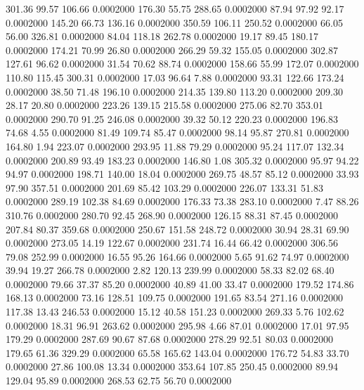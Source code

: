  301.36   99.57  106.66   0.0002000
 176.30   55.75  288.65   0.0002000
  87.94   97.92   92.17   0.0002000
 145.20   66.73  136.16   0.0002000
 350.59  106.11  250.52   0.0002000
  66.05   56.00  326.81   0.0002000
  84.04  118.18  262.78   0.0002000
  19.17   89.45  180.17   0.0002000
 174.21   70.99   26.80   0.0002000
 266.29   59.32  155.05   0.0002000
 302.87  127.61   96.62   0.0002000
  31.54   70.62   88.74   0.0002000
 158.66   55.99  172.07   0.0002000
 110.80  115.45  300.31   0.0002000
  17.03   96.64    7.88   0.0002000
  93.31  122.66  173.24   0.0002000
  38.50   71.48  196.10   0.0002000
 214.35  139.80  113.20   0.0002000
 209.30   28.17   20.80   0.0002000
 223.26  139.15  215.58   0.0002000
 275.06   82.70  353.01   0.0002000
 290.70   91.25  246.08   0.0002000
  39.32   50.12  220.23   0.0002000
 196.83   74.68    4.55   0.0002000
  81.49  109.74   85.47   0.0002000
  98.14   95.87  270.81   0.0002000
 164.80    1.94  223.07   0.0002000
 293.95   11.88   79.29   0.0002000
  95.24  117.07  132.34   0.0002000
 200.89   93.49  183.23   0.0002000
 146.80    1.08  305.32   0.0002000
  95.97   94.22   94.97   0.0002000
 198.71  140.00   18.04   0.0002000
 269.75   48.57   85.12   0.0002000
  33.93   97.90  357.51   0.0002000
 201.69   85.42  103.29   0.0002000
 226.07  133.31   51.83   0.0002000
 289.19  102.38   84.69   0.0002000
 176.33   73.38  283.10   0.0002000
   7.47   88.26  310.76   0.0002000
 280.70   92.45  268.90   0.0002000
 126.15   88.31   87.45   0.0002000
 207.84   80.37  359.68   0.0002000
 250.67  151.58  248.72   0.0002000
  30.94   28.31   69.90   0.0002000
 273.05   14.19  122.67   0.0002000
 231.74   16.44   66.42   0.0002000
 306.56   79.08  252.99   0.0002000
  16.55   95.26  164.66   0.0002000
   5.65   91.62   74.97   0.0002000
  39.94   19.27  266.78   0.0002000
   2.82  120.13  239.99   0.0002000
  58.33   82.02   68.40   0.0002000
  79.66   37.37   85.20   0.0002000
  40.89   41.00   33.47   0.0002000
 179.52  174.86  168.13   0.0002000
  73.16  128.51  109.75   0.0002000
 191.65   83.54  271.16   0.0002000
 117.38   13.43  246.53   0.0002000
  15.12   40.58  151.23   0.0002000
 269.33    5.76  102.62   0.0002000
  18.31   96.91  263.62   0.0002000
 295.98    4.66   87.01   0.0002000
  17.01   97.95  179.29   0.0002000
 287.69   90.67   87.68   0.0002000
 278.29   92.51   80.03   0.0002000
 179.65   61.36  329.29   0.0002000
  65.58  165.62  143.04   0.0002000
 176.72   54.83   33.70   0.0002000
  27.86  100.08   13.34   0.0002000
 353.64  107.85  250.45   0.0002000
  89.94  129.04   95.89   0.0002000
 268.53   62.75   56.70   0.0002000
